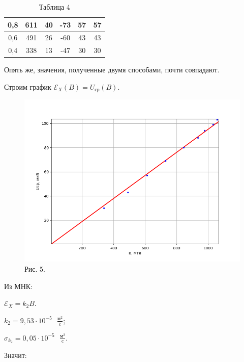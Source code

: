 \documentclass[a4paper,12pt]{article} %
\begin{document}
\begin{table}[h!]
\begin{tabular}{|c|c|c|c|c|c|}
		0,8                     & 611                       & 40                           & -73                          & 57                               & 57                  \\ \hline
		0,6                     & 491                       & 26                           & -60                          & 43                               & 43                  \\ \hline
		0,4                     & 338                       & 13                           & -47                          & 30                               & 30                  \\ \hline
	\end{tabular}
	\caption*{Таблица 4}
\end{table}

Опять же, значения, полученные двумя способами, почти совпадают.

\vspace{3mm}
Строим график $\mathscr{E}_X(B) = U_{\text{ср}}(B)$.

\begin{figure}[h!]
	\centering
	\includegraphics[scale=0.8]{Pictures/0,5мАмпер.png}
	\caption*{Рис. 5.}
\end{figure}

Из МНК:

$\mathscr{E}_X = k_2B$.

$k_2 = 9,53 \cdot 10^{-5} \text{ }\frac{\text{м}^2}{\text{c}}$;

$\sigma_{k_2} = 0,05\cdot 10^{-5} \text{ }\frac{\text{м}^2}{\text{c}}$.

Значит:
\end{document}
